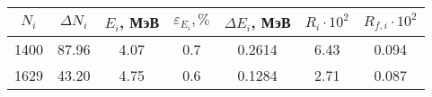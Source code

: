 \begin{tabular}{ccccccc}
\toprule
$N_i$ & $\Delta N_i$ & $E_i$, МэВ & $\varepsilon_{E_i}, \%$ & $\Delta E_i$, МэВ & $R_i \cdot 10^2$ & $R_{f,i} \cdot 10^2$ \\
\midrule
1400 & 87.96 & 4.07 & 0.7 & 0.2614 & 6.43 & 0.094 \\
1629 & 43.20 & 4.75 & 0.6 & 0.1284 & 2.71 & 0.087 \\
\bottomrule
\end{tabular}
